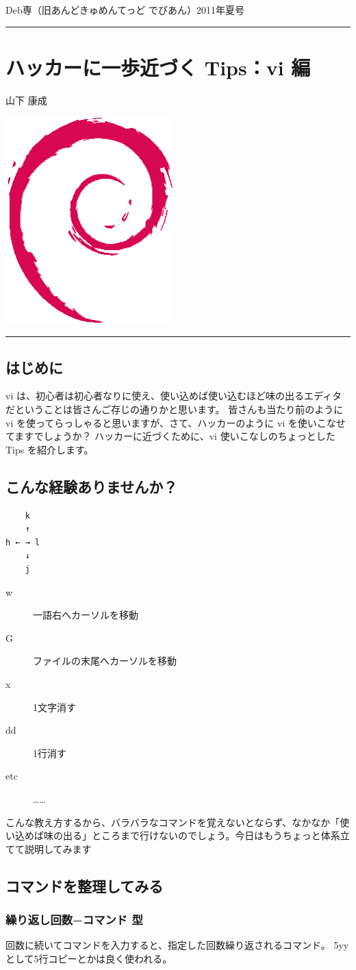 \documentclass[mingoth,a4paper]{jsarticle}
\renewcommand{\dancersection}[2]{%
\newpage
Deb専（旧あんどきゅめんてっど でびあん）2011年夏号
%
\vspace{0.1mm}\\
{\color{dancerdarkblue}\rule{\hsize}{2mm}}

%
%
\begin{minipage}[t]{0.6\hsize}
\color{dancerdarkblue}
\vspace{1cm}
\section{#1}
\hfill{}#2\\
\end{minipage}
\begin{minipage}[t]{0.4\hsize}
\vspace{-2cm}
\hfill{}\includegraphics[height=8cm]{image200502/openlogo-nd.eps}\\
\vspace{-5cm}
\end{minipage}
%
{\color{dancerlightblue}\rule{0.66\hsize}{2mm}}
%
\vspace{2cm}
}
\begin{document}
\dancersection{ハッカーに一歩近づく Tips：vi 編}{山下 康成}
\subsection{はじめに}

vi は、初心者は初心者なりに使え、使い込めば使い込むほど味の出るエディタだということは皆さんご存じの通りかと思います。
皆さんも当たり前のように vi を使ってらっしゃると思いますが、さて、ハッカーのように vi を使いこなせてますでしょうか？
ハッカーに近づくために、vi 使いこなしのちょっとした Tips を紹介します。

\subsection{こんな経験ありませんか？}

\begin{verbatim}
    k
    ↑
h ← → l
    ↓
    j
\end{verbatim}

\begin{description}
  \item[w] 一語右へカーソルを移動
  \item[G] ファイルの末尾へカーソルを移動
  \item[x] 1文字消す
  \item[dd] 1行消す
  \item[etc] ……
\end{description}

こんな教え方するから、バラバラなコマンドを覚えないとならず、なかなか「使い込めば味の出る」ところまで行けないのでしょう。今日はもうちょっと体系立てて説明してみます

\subsection{コマンドを整理してみる}

\subsubsection{繰り返し回数−コマンド 型}

回数に続いてコマンドを入力すると、指定した回数繰り返されるコマンド。
5yy として5行コピーとかは良く使われる。
\end{document}

